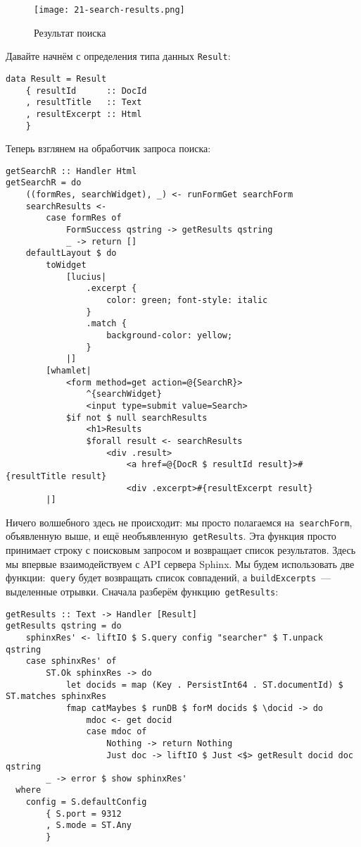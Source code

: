 \begin{figure}[hbt]
    \begin{center}
        \texttt{[image: 21-search-results.png]}
        \caption{Результат поиска}\label{Fig:search_results}
    \end{center}
\end{figure}

Давайте начнём с определения типа данных \lstinline'Result':
\begin{lstlisting}
data Result = Result
    { resultId      :: DocId
    , resultTitle   :: Text
    , resultExcerpt :: Html
    }
\end{lstlisting}

Теперь взглянем на обработчик запроса поиска: %
\begin{lstlisting}
getSearchR :: Handler Html
getSearchR = do
    ((formRes, searchWidget), _) <- runFormGet searchForm
    searchResults <-
        case formRes of
            FormSuccess qstring -> getResults qstring
            _ -> return []
    defaultLayout $ do
        toWidget
            [lucius|
                .excerpt {
                    color: green; font-style: italic
                }
                .match {
                    background-color: yellow;
                }
            |]
        [whamlet|
            <form method=get action=@{SearchR}>
                ^{searchWidget}
                <input type=submit value=Search>
            $if not $ null searchResults
                <h1>Results
                $forall result <- searchResults
                    <div .result>
                        <a href=@{DocR $ resultId result}>#{resultTitle result}
                        <div .excerpt>#{resultExcerpt result}
        |]
\end{lstlisting}%

Ничего волшебного здесь не происходит: мы просто полагаемся
на~\lstinline'searchForm', объявленную выше, и ещё
необъявленную~\lstinline'getResults'. Эта функция просто принимает строку с
поисковым запросом и возвращает список результатов. Здесь мы впервые
взаимодействуем с API сервера Sphinx. Мы будем использовать две
функции:~\lstinline'query' будет возвращать список совпадений, а
\lstinline'buildExcerpts'~--- выделенные отрывки. Сначала разберём
функцию~\lstinline!getResults!:
\begin{lstlisting}
getResults :: Text -> Handler [Result]
getResults qstring = do
    sphinxRes' <- liftIO $ S.query config "searcher" $ T.unpack qstring
    case sphinxRes' of
        ST.Ok sphinxRes -> do
            let docids = map (Key . PersistInt64 . ST.documentId) $ ST.matches sphinxRes
            fmap catMaybes $ runDB $ forM docids $ \docid -> do
                mdoc <- get docid
                case mdoc of
                    Nothing -> return Nothing
                    Just doc -> liftIO $ Just <$> getResult docid doc qstring
        _ -> error $ show sphinxRes'
  where
    config = S.defaultConfig
        { S.port = 9312
        , S.mode = ST.Any
        }
\end{lstlisting}%

